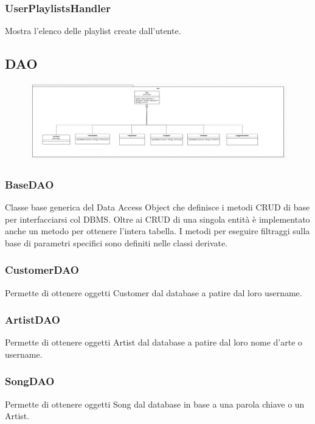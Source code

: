 \documentclass{article}
\begin{document}
  \subsubsection{UserPlaylistsHandler}
  Mostra l'elenco delle playlist create dall'utente.

  \subsection{DAO}

  \begin{figure}[H]
    \includegraphics[scale=0.3]{dao01}
  \end{figure}

  \subsubsection{BaseDAO}
  Classe base generica del Data Access Object che definisce i metodi CRUD di base per interfacciarsi col DBMS.
  Oltre ai CRUD di una singola entità è implementato anche un metodo per ottenere l'intera tabella. I metodi per eseguire filtraggi sulla base di parametri specifici sono definiti nelle classi derivate.

  \subsubsection{CustomerDAO}
  Permette di ottenere oggetti Customer dal database a patire dal loro username.

  \subsubsection{ArtistDAO}
  Permette di ottenere oggetti Artist dal database a patire dal loro nome d'arte o username.

  \subsubsection{SongDAO}
  Permette di ottenere oggetti Song dal database in base a una parola chiave o un Artist.
\end{document}
